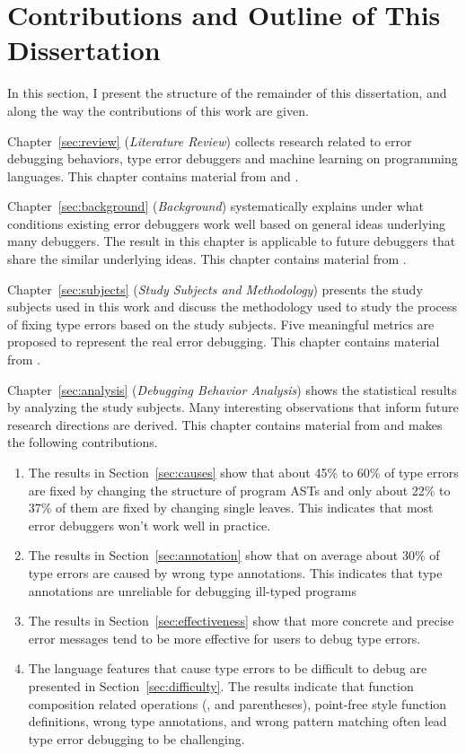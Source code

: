 \documentclass[12pt]{report}	%
\begin{document}
\section{Contributions and Outline of This Dissertation}

In this section, I present the structure of the remainder of this dissertation,
and along the way the contributions of this work are given.

Chapter~\ref{sec:review} (\emph{Literature Review}) collects research related to error debugging behaviors,  
type error debuggers and machine learning on programming languages.
This chapter contains material from \cite{wu2017type} and \cite{wu2017learning}.

Chapter~\ref{sec:background} (\emph{Background}) systematically explains under what conditions existing error debuggers work well
based on general ideas underlying many debuggers.
The result in this chapter is applicable to future debuggers that share the similar underlying ideas.
This chapter contains material from \cite{wu2017type}.

Chapter~\ref{sec:subjects} (\emph{Study Subjects and Methodology}) presents the study subjects used in this work and
discuss the methodology used to study the process of fixing type errors based on the study subjects.
Five meaningful metrics are proposed to represent the real error debugging.
This chapter contains material from \cite{wu2017type}.

Chapter~\ref{sec:analysis} (\emph{Debugging Behavior Analysis}) shows the statistical results by analyzing the study subjects.
Many interesting observations that inform future research directions are derived.
This chapter contains material from \cite{wu2017type} and makes the following contributions.

\begin{enumerate}
\item The results in Section~\ref{sec:causes} show that about 45\% to 60\% of type errors are fixed by changing the structure of program ASTs 
and only about 22\% to 37\% of them are fixed by changing single leaves.
This indicates that most error debuggers won't work well in practice.

\item The results in Section~\ref{sec:annotation} show that on average about 30\% of type errors are caused by wrong type annotations.
This indicates that type annotations are unreliable for debugging ill-typed programs

\item The results in Section~\ref{sec:effectiveness} show that more concrete and precise error messages tend to be more effective for users to debug type errors.

\item The language features that cause type errors to be difficult to debug are presented in Section~\ref{sec:difficulty}.
The results indicate that function composition related operations (, \prog{\$} and parentheses),
point-free style function definitions, wrong type annotations, and wrong pattern matching often lead type error debugging to be challenging.
\end{enumerate}
\end{document}
